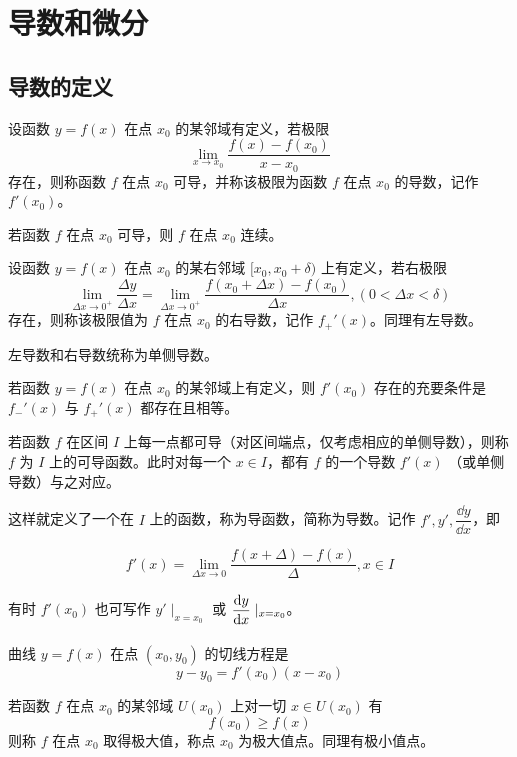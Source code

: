 \chapter{导数和微分}

\section{导数的定义}

\begin{definition}
	设函数 $y=f(x)$ 在点 $x_0$ 的某邻域有定义，若极限
	$$\lim_{x\to x_0}\frac{f(x)-f(x_0)}{x-x_0}$$
	存在，则称函数 $f$ 在点 $x_0$ 可导，并称该极限为函数 $f$ 在点 $x_0$ 的导数，记作 $f'(x_0)$。
\end{definition}

\begin{theorem}
	若函数 $f$ 在点 $x_0$ 可导，则 $f$ 在点 $x_0$ 连续。
\end{theorem}

\begin{definition}
	设函数 $y=f(x)$ 在点 $x_0$ 的某右邻域 $[x_0,x_0+\delta)$ 上有定义，若右极限
	$$\lim_{\Delta x\to 0^+}\frac{\Delta y}{\Delta x} = \lim_{\Delta x\to 0^+}\frac{f(x_0+\Delta x)-f(x_0)}{\Delta x},(0<\Delta x<\delta)$$
	存在，则称该极限值为 $f$ 在点 $x_0$ 的右导数，记作 $f_+'(x)$。同理有左导数。
\end{definition}

左导数和右导数统称为单侧导数。

\begin{theorem}
	若函数 $y=f(x)$ 在点 $x_0$ 的某邻域上有定义，则 $f'(x_0)$ 存在的充要条件是 $f_-'(x)$ 与 $f_+'(x)$ 都存在且相等。
\end{theorem}

若函数 $f$ 在区间 $I$ 上每一点都可导（对区间端点，仅考虑相应的单侧导数），则称 $f$ 为 $I$ 上的可导函数。此时对每一个 $x\in I$，都有 $f$ 的一个导数 $f'(x)$ （或单侧导数）与之对应。

这样就定义了一个在 $I$ 上的函数，称为导函数，简称为导数。记作 $f',y',\dfrac{\dd y}{\dd x}$，即

$$f'(x) = \lim_{\Delta x \to 0}\frac{f(x+\Delta)-f(x)}{\Delta},x\in I$$

有时 $f'(x_0)$ 也可写作 $y'\mid_{x=x_0}$ 或 $\mfrac{\dd y}{\dd x}\mid_{x=x_0}$。

曲线 $y = f(x)$ 在点 $(x_0,y_0)$ 的切线方程是
$$y-y_0 = f'(x_0)(x-x_0)$$

\begin{definition}
	若函数 $f$ 在点 $x_0$ 的某邻域 $U(x_0)$ 上对一切 $x\in U(x_0)$ 有
	$$f(x_0) \geqslant f(x)$$
	则称 $f$ 在点 $x_0$ 取得极大值，称点 $x_0$ 为极大值点。同理有极小值点。
\end{definition}

